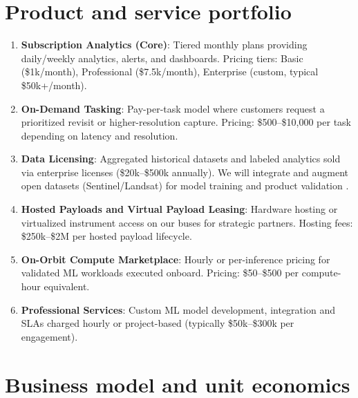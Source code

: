 \section{Product and service portfolio}
\begin{enumerate}
  \item \textbf{Subscription Analytics (Core)}: Tiered monthly plans providing daily/weekly analytics, alerts, and dashboards. Pricing tiers: Basic (\$1k/month), Professional (\$7.5k/month), Enterprise (custom, typical \$50k+/month).
  \item \textbf{On-Demand Tasking}: Pay-per-task model where customers request a prioritized revisit or higher-resolution capture. Pricing: \$500--\$10,000 per task depending on latency and resolution.
  \item \textbf{Data Licensing}: Aggregated historical datasets and labeled analytics sold via enterprise licenses (\$20k--\$500k annually). We will integrate and augment open datasets (Sentinel/Landsat) for model training and product validation \parencite{copernicus,earthexplorer}.
  \item \textbf{Hosted Payloads and Virtual Payload Leasing}: Hardware hosting or virtualized instrument access on our buses for strategic partners. Hosting fees: \$250k--\$2M per hosted payload lifecycle.
  \item \textbf{On-Orbit Compute Marketplace}: Hourly or per-inference pricing for validated ML workloads executed onboard. Pricing: \$50--\$500 per compute-hour equivalent.
  \item \textbf{Professional Services}: Custom ML model development, integration and SLAs charged hourly or project-based (typically \$50k--\$300k per engagement).
\end{enumerate}

\section{Business model and unit economics}
